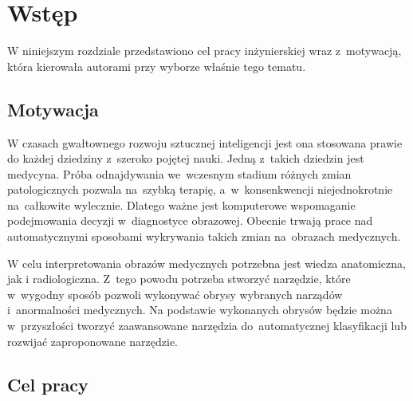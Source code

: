 \documentclass[a4paper,11pt,twoside,openright]{report}
\theoremstyle{definition}
\begin{document}
\thispagestyle{empty}
\newpage

\null\thispagestyle{empty}\newpage


\tableofcontents
\thispagestyle{empty}


\null\thispagestyle{empty}\newpage
\pagestyle{fancy}
\setcounter{page}{11} %

\chapter*{Wstęp}

W niniejszym rozdziale przedstawiono cel pracy inżynierskiej wraz z~motywacją,
która kierowała autorami przy wyborze właśnie tego tematu.

\section*{Motywacja}

W czasach gwałtownego rozwoju sztucznej inteligencji jest ona stosowana prawie
do każdej dziedziny z~szeroko pojętej nauki. Jedną z~takich dziedzin jest medycyna.
Próba odnajdywania we~wczesnym stadium różnych zmian patologicznych pozwala
na~szybką terapię, a~w~konsenkwencji niejednokrotnie na~całkowite wylecznie. Dlatego
ważne jest komputerowe wspomaganie podejmowania decyzji w~diagnostyce obrazowej.
Obecnie trwają prace nad automatycznymi
sposobami wykrywania takich zmian na~obrazach medycznych.

W celu interpretowania obrazów medycznych potrzebna jest wiedza anatomiczna, jak
i radiologiczna. Z~tego powodu potrzeba stworzyć narzędzie, które w~wygodny sposób
pozwoli wykonywać obrysy wybranych narządów i~anormalności medycznych. Na
podstawie wykonanych obrysów będzie można w~przyszłości tworzyć zaawansowane
narzędzia do~automatycznej klasyfikacji lub rozwijać zaproponowane narzędzie.

\section*{Cel pracy}
\end{document}
